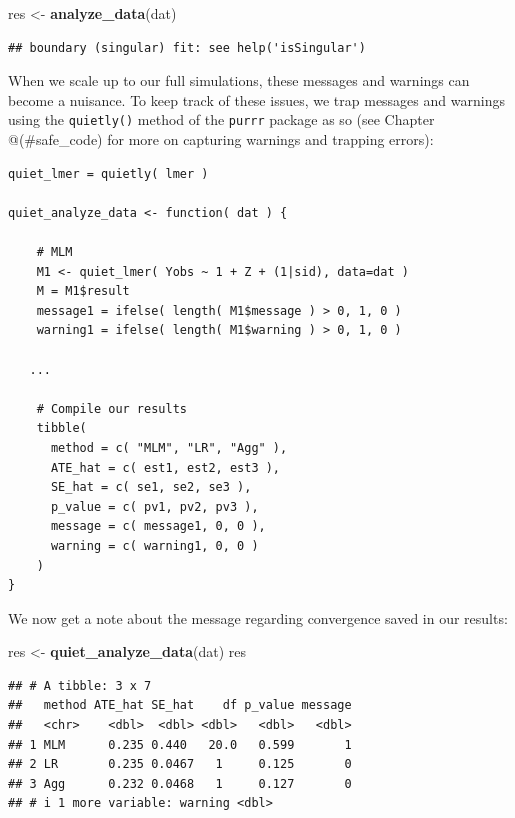 \documentclass[
]{book}
\newenvironment{Shaded}{\begin{snugshade}}{\end{snugshade}}
\newcommand{\FunctionTok}[1]{\textcolor[rgb]{0.13,0.29,0.53}{\textbf{#1}}}
\newcommand{\NormalTok}[1]{#1}
\newcommand{\OtherTok}[1]{\textcolor[rgb]{0.56,0.35,0.01}{#1}}
\begin{document}
\begin{Shaded}
\begin{Highlighting}[]
\NormalTok{res }\OtherTok{\textless{}{-}} \FunctionTok{analyze\_data}\NormalTok{(dat)}
\end{Highlighting}
\end{Shaded}

\begin{verbatim}
## boundary (singular) fit: see help('isSingular')
\end{verbatim}

When we scale up to our full simulations, these messages and warnings can become a nuisance.
To keep track of these issues, we trap messages and warnings using the \texttt{quietly()} method of the \texttt{purrr} package as so (see Chapter @(\#safe\_code) for more on capturing warnings and trapping errors):

\begin{verbatim}
quiet_lmer = quietly( lmer )

quiet_analyze_data <- function( dat ) {
    
    # MLM
    M1 <- quiet_lmer( Yobs ~ 1 + Z + (1|sid), data=dat )
    M = M1$result
    message1 = ifelse( length( M1$message ) > 0, 1, 0 )
    warning1 = ifelse( length( M1$warning ) > 0, 1, 0 )

   ...

    # Compile our results
    tibble( 
      method = c( "MLM", "LR", "Agg" ),
      ATE_hat = c( est1, est2, est3 ),
      SE_hat = c( se1, se2, se3 ),
      p_value = c( pv1, pv2, pv3 ),
      message = c( message1, 0, 0 ),
      warning = c( warning1, 0, 0 )
    )
}
\end{verbatim}

We now get a note about the message regarding convergence saved in our results:

\begin{Shaded}
\begin{Highlighting}[]
\NormalTok{res }\OtherTok{\textless{}{-}} \FunctionTok{quiet\_analyze\_data}\NormalTok{(dat)}
\NormalTok{res}
\end{Highlighting}
\end{Shaded}

\begin{verbatim}
## # A tibble: 3 x 7
##   method ATE_hat SE_hat    df p_value message
##   <chr>    <dbl>  <dbl> <dbl>   <dbl>   <dbl>
## 1 MLM      0.235 0.440   20.0   0.599       1
## 2 LR       0.235 0.0467   1     0.125       0
## 3 Agg      0.232 0.0468   1     0.127       0
## # i 1 more variable: warning <dbl>
\end{verbatim}
\end{document}
